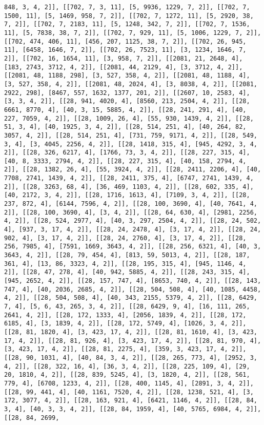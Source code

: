 \documentclass[12pt,fleqn]{article}\usepackage{../../common}
\begin{document}
\begin{verbatim}
848, 3, 4, 2]], [[702, 7, 3, 11], [5, 9936, 1229, 7, 2]], [[702, 7, 1500, 11], [5, 1469, 958, 7, 2]], [[702, 7, 1272, 11], [5, 2920, 38, 7, 2]], [[702, 7, 2183, 11], [5, 1248, 342, 7, 2]], [[702, 7, 1536, 11], [5, 7838, 38, 7, 2]], [[702, 7, 929, 11], [5, 1006, 1229, 7, 2]], [[702, 474, 406, 11], [456, 207, 1125, 38, 7, 2]], [[702, 26, 945, 11], [6458, 1646, 7, 2]], [[702, 26, 7523, 11], [3, 1234, 1646, 7, 2]], [[702, 16, 1654, 11], [3, 958, 7, 2]], [[2081, 21, 2648, 4], [183, 2743, 3712, 4, 2]], [[2081, 44, 2129, 4], [3, 3712, 4, 2]], [[2081, 48, 1188, 298], [3, 527, 358, 4, 2]], [[2081, 48, 1188, 4], [3, 527, 358, 4, 2]], [[2081, 48, 2024, 4], [3, 8038, 4, 2]], [[2081, 2922, 298], [8467, 557, 1632, 1377, 201, 2]], [[2607, 10, 2583, 4], [3, 3, 4, 2]], [[28, 941, 4020, 4], [8560, 213, 2504, 4, 2]], [[28, 6661, 8770, 4], [40, 3, 15, 5885, 4, 2]], [[28, 241, 291, 4], [40, 227, 7059, 4, 2]], [[28, 1009, 26, 4], [55, 930, 1439, 4, 2]], [[28, 51, 3, 4], [40, 1925, 3, 4, 2]], [[28, 514, 251, 4], [40, 264, 82, 3057, 4, 2]], [[28, 514, 251, 4], [731, 759, 9171, 4, 2]], [[28, 549, 3, 4], [3, 4045, 2256, 4, 2]], [[28, 1418, 315, 4], [945, 4292, 3, 4, 2]], [[28, 326, 6217, 4], [1766, 73, 3, 4, 2]], [[28, 227, 315, 4], [40, 8, 3333, 2794, 4, 2]], [[28, 227, 315, 4], [40, 158, 2794, 4, 2]], [[28, 1382, 26, 4], [55, 3924, 4, 2]], [[28, 2411, 2206, 4], [40, 7708, 2741, 1439, 4, 2]], [[28, 2411, 375, 4], [6747, 2741, 1439, 4, 2]], [[28, 3263, 68, 4], [36, 469, 1103, 4, 2]], [[28, 602, 335, 4], [40, 2172, 3, 4, 2]], [[28, 1716, 1613, 4], [7109, 3, 4, 2]], [[28, 237, 872, 4], [6144, 7596, 4, 2]], [[28, 100, 3690, 4], [40, 7641, 4, 2]], [[28, 100, 3690, 4], [3, 4, 2]], [[28, 64, 630, 4], [2981, 2256, 4, 2]], [[28, 524, 2977, 4], [40, 3, 297, 2504, 4, 2]], [[28, 24, 502, 4], [937, 3, 17, 4, 2]], [[28, 24, 2478, 4], [3, 17, 4, 2]], [[28, 24, 902, 4], [3, 17, 4, 2]], [[28, 24, 2760, 4], [3, 17, 4, 2]], [[28, 256, 7985, 4], [7591, 1669, 3643, 4, 2]], [[28, 256, 6321, 4], [40, 3, 3643, 4, 2]], [[28, 79, 454, 4], [813, 59, 5013, 4, 2]], [[28, 187, 361, 4], [13, 86, 3323, 4, 2]], [[28, 195, 315, 4], [945, 1146, 4, 2]], [[28, 47, 278, 4], [40, 942, 5885, 4, 2]], [[28, 243, 315, 4], [945, 2652, 4, 2]], [[28, 157, 747, 4], [8653, 740, 4, 2]], [[28, 143, 747, 4], [40, 2036, 2685, 4, 2]], [[28, 504, 508, 4], [40, 1085, 4458, 4, 2]], [[28, 504, 508, 4], [40, 343, 2155, 5379, 4, 2]], [[28, 6429, 7, 4], [5, 6, 43, 265, 3, 4, 2]], [[28, 6429, 9, 4], [16, 111, 265, 2641, 4, 2]], [[28, 172, 1333, 4], [2056, 1839, 4, 2]], [[28, 172, 6185, 4], [3, 1839, 4, 2]], [[28, 172, 5749, 4], [1026, 3, 4, 2]], [[28, 81, 1820, 4], [3, 423, 17, 4, 2]], [[28, 81, 1610, 4], [3, 423, 17, 4, 2]], [[28, 81, 926, 4], [3, 423, 17, 4, 2]], [[28, 81, 970, 4], [3, 423, 17, 4, 2]], [[28, 81, 2275, 4], [359, 3, 423, 17, 4, 2]], [[28, 90, 1031, 4], [40, 84, 3, 4, 2]], [[28, 265, 773, 4], [2952, 3, 4, 2]], [[28, 322, 16, 4], [36, 3, 4, 2]], [[28, 225, 109, 4], [29, 20, 1810, 4, 2]], [[28, 839, 5245, 4], [3, 1820, 4, 2]], [[28, 561, 779, 4], [6708, 1233, 4, 2]], [[28, 400, 1145, 4], [2891, 3, 4, 2]], [[28, 99, 441, 4], [40, 1161, 7520, 4, 2]], [[28, 1238, 521, 4], [3, 172, 3077, 4, 2]], [[28, 163, 921, 4], [6421, 1146, 4, 2]], [[28, 84, 3, 4], [40, 3, 3, 4, 2]], [[28, 84, 1959, 4], [40, 5765, 6984, 4, 2]], [[28, 84, 2699, 
\end{verbatim}
\end{document}
